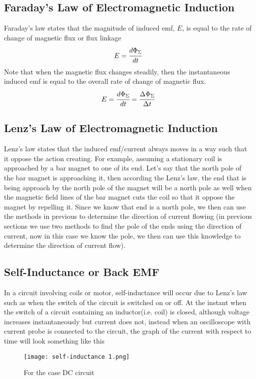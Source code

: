 \documentclass{article}
\begin{document}
     \subsection{Faraday's Law of Electromagnetic Induction}


Faraday's law states that the magnitude of induced emf, $E$, is equal to the rate of change of magnetic flux or flux linkage
$$E=\cfrac{d\Phi_{\Sigma}}{dt}$$
Note that when the magnetic flux changes steadily, then the instantaneous induced emf is equal to the overall rate of change of magnetic flux.
$$E=\cfrac{d\Phi_{\Sigma}}{dt}=\cfrac{\Delta \Phi_{\Sigma}}{\Delta t}$$


 \subsection{Lenz's Law of Electromagnetic Induction}


Lenz's law states that the induced emf/current always moves in a way such that it oppose the action creating. For example, assuming a stationary coil is approached by a bar magnet to one of its end. Let's say that the north pole of the bar magnet is approaching it, then according the Lenz's law, the end that is being approach by the north pole of the magnet will be a north pole as well when the magnetic field lines of the bar magnet cuts the coil so that it oppose the magnet by repelling it. Since we know that end is a north pole, we then can use the methods in previous to determine the direction of current flowing (in previous sections we use two methods to find the pole of the ends using the direction of current, now in this case we know the pole, we then can use this knowledge to determine the direction of current flow).


\subsection{Self-Inductance or Back EMF}


In a circuit involving coils or motor, self-inductance will occur due to Lenz's law such as when the switch of the circuit is switched on or off. At the instant when the switch of a circuit containing an inductor(i.e. coil) is closed, although voltage increases instantaneously but current does not, instead when an oscilloscope with current probe is connected to the circuit, the graph of the current with respect to time will look something like this   

\begin{figure}[H]
    \centering
    \texttt{[image: self-inductance 1.png]}
    \caption*{For the case DC circuit}
   
\end{figure}
\end{document}
